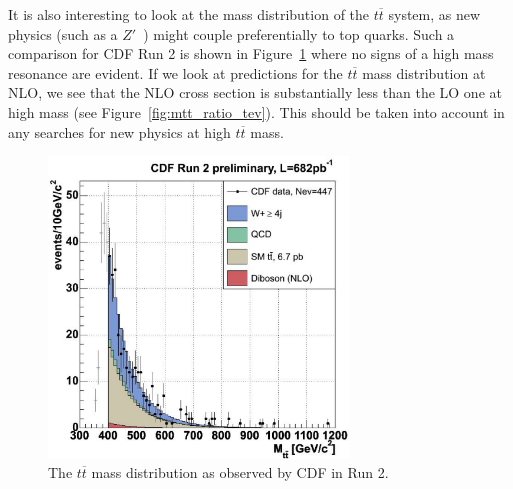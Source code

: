 \documentclass[12pt]{iopart}
\begin{document}
It is also interesting to look at the mass distribution of the $t\overline{t}$ system, as new physics (such as a
$Z'$~\cite{Hill:2002ap}) might couple preferentially to top quarks. Such a comparison for CDF Run 2 is shown in
Figure~\ref{fig:cdftTmass} where no signs of a high mass resonance are evident. 
If we look at predictions for the
$t\overline{t}$ mass distribution at NLO, we see that the NLO cross section is substantially less than the LO one at
high mass (see Figure~\ref{fig:mtt_ratio_tev}). This should be taken into account in any searches for new physics at high
$t\overline{t}$ mass. 

\begin{figure}[t]
\begin{center}
\includegraphics[width=8cm,angle=0]{CDF_tT_mass.eps}
\end{center}
\vspace*{-0.5cm}
\caption{The $t\overline{t}$ mass distribution as observed by CDF in Run 2.
\label{fig:cdftTmass}}
\end{figure}
%
\end{document}
